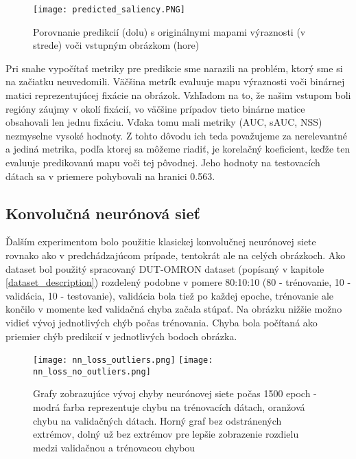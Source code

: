 \begin{figure}[H]
	\begin{center}
		\texttt{[image: predicted\_saliency.PNG]}
		\caption[Porovnanie prvotných výsledkov]{
			Porovnanie predikcií (dolu) s originálnymi mapami výraznosti (v strede) voči vstupným obrázkom (hore)
		}\label{results_image}
	\end{center}
\end{figure}

Pri snahe vypočítať metriky pre predikcie sme narazili na problém, ktorý sme si na začiatku neuvedomili. Väčšina metrík evaluuje mapu výraznosti voči binárnej matici reprezentujúcej fixácie na obrázok. Vzhľadom na to, že našim vstupom boli regióny záujmy v okolí fixácií, vo väčšine prípadov tieto binárne matice obsahovali len jednu fixáciu. Vďaka tomu mali metriky (AUC, sAUC, NSS) nezmyselne vysoké hodnoty. Z tohto dôvodu ich teda považujeme za nerelevantné a jediná metrika, podľa ktorej sa môžeme riadiť, je korelačný koeficient, keďže ten evaluuje predikovanú mapu voči tej pôvodnej. Jeho hodnoty na testovacích dátach sa v priemere pohybovali na hranici 0.563.

\subsection{Konvolučná neurónová sieť}
\label{experiments_cnn}

Ďalším experimentom bolo použitie klasickej konvolučnej neurónovej siete rovnako ako v predchádzajúcom prípade, tentokrát ale na celých obrázkoch. Ako dataset bol použitý spracovaný DUT-OMRON dataset (popísaný v kapitole \ref{dataset_description}) rozdelený podobne v pomere 80:10:10 (80 - trénovanie, 10 - validácia, 10 - testovanie), validácia bola tiež po každej epoche, trénovanie ale končilo v momente keď validačná chyba začala stúpať. Na obrázku nižšie možno vidieť vývoj jednotlivých chýb počas trénovania. Chyba bola počítaná ako priemier chýb predikcií v jednotlivých bodoch obrázka.

\begin{figure}[H]
	\begin{center}
	
	\texttt{[image: nn\_loss\_outliers.png]}
	\texttt{[image: nn\_loss\_no\_outliers.png]}
		\caption[Vývoj chyby počas trénovania konvolučnej neurónovej siete]{
			Grafy zobrazujúce vývoj chyby neurónovej siete počas 1500 epoch - modrá farba reprezentuje chybu na trénovacích dátach, oranžová chybu na validačných dátach. Horný graf bez odstránených extrémov, dolný už bez extrémov pre lepšie zobrazenie rozdielu medzi validačnou a trénovacou chybou
		}\label{cnn_loss_outliers}
	\end{center}
\end{figure}

